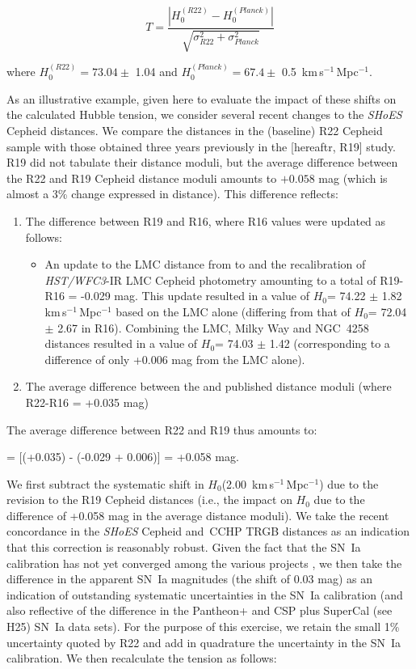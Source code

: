 \documentclass[12pt,modern]{aastex631}
\newcommand{\cchp}{\,CCHP\xspace}
\newcommand{\ho}{$H_{0}$\xspace}
\newcommand{\hounits}{\,km\,s$^{-1}$\,Mpc$^{-1}$\xspace}
\newcommand{\hstwfciii}{\emph{HST/WFC3}\xspace}
\newcommand{\sn}{SN~Ia\xspace}
\newcommand{\shoes}{\emph{SHoES}\xspace}
\newcommand{\ngc}{NGC\,\xspace}
\begin{document}
\[
T = \frac{\left| H_0^{(R22)} - H_0^{(Planck)} \right|}{\sqrt{\sigma_{R22}^2 + \sigma_{Planck}^2}}
\]


\noindent
where $H_0^{(R22)} = 73.04 \pm$ 1.04 and $H_0^{(Planck)} = 67.4 \pm $ 0.5 \hounits.

As an illustrative example, given here to evaluate the impact of these shifts on the calculated Hubble tension, we consider several recent changes to the \shoes Cepheid distances. We compare the distances in the (baseline) R22 Cepheid sample with those obtained three years previously in the \citet{riess_2019} [hereaftr, R19] study.  R19 did not tabulate their distance moduli, but the average difference between the R22 and R19 Cepheid distance moduli amounts to $+0.058$ mag (which is almost a 3\% change expressed in  distance).
This difference reflects:
\begin{enumerate}
    \item The difference between R19 and R16, where R16 values were updated as follows:
    \begin{itemize}
        \item An update to the LMC distance from \citet{pietrzynski_2013} to \citet{pietrzynski_2019} and the recalibration of \hstwfciii-IR LMC Cepheid photometry amounting to a total of R19-R16 = -0.029 mag. This update resulted in a value of \ho = 74.22 $\pm$ 1.82 \hounits based on the LMC alone (differing from that of \ho = 72.04 $\pm$ 2.67 in R16). Combining the LMC, Milky Way and \ngc 4258 distances resulted in a value of \ho = 74.03 $\pm$ 1.42 (corresponding to a difference of only +0.006 mag from the LMC alone). 
    \end{itemize}
    \item The average difference between the \citet{riess_2022} and \cite{riess_2016} published distance moduli (where R22-R16 = +0.035 mag) 
\end{enumerate}

The average difference between R22 and R19 thus amounts to: 
\par\noindent[(R22-R16) - (R19-R16)] = [(+0.035) - (-0.029 + 0.006)] = +0.058 mag. 


We first subtract the systematic shift in \ho (2.00 \hounits) due to the revision to the R19 Cepheid distances (i.e., the impact on \ho due to the difference of +0.058 mag in the average distance moduli). We take the recent concordance in the \shoes Cepheid and \cchp TRGB distances as an indication that this correction is reasonably robust.  Given the fact that the \sn calibration has not yet converged among the various projects \citep[see also][] {DESI_2024}, we then take the difference in the apparent \sn magnitudes (the shift of 0.03 mag) as an indication of outstanding systematic uncertainties in the \sn calibration (and also reflective of the difference in the Pantheon+ and CSP plus SuperCal (see H25) \sn data sets). For the purpose of this exercise, we retain the small 1\% uncertainty quoted by R22 and add in quadrature the uncertainty in the \sn calibration. We then recalculate the tension as follows:  
\end{document}
